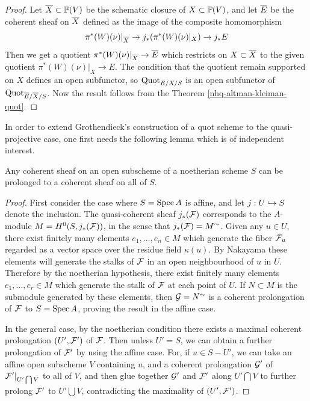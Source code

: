 \begin{proof} Let $\overline{X} \subset \mathbb{P}(V)$ be the schematic closure of
$X\subset \mathbb{P}(V)$, and let $\overline{E}$ be the coherent sheaf on $\overline{X}$
defined as the image of the composite homomorphism
$$\pi^*(W)(\nu)|_{\overline{X}} \to j_*(\pi^*(W)(\nu)|_X) \to j_*E$$
Then we get a quotient $\pi^*(W)(\nu)|_{\overline{X}} \to \overline{E}$
which restricts on $X\subset \overline{X}$ to the given quotient
$\pi^*(W)(\nu)|_X\to E$. The condition that the quotient remain supported
on $X$ defines an open subfunctor, so
$\operatorname{Quot}_{E/X/S}$ is an open subfunctor of
$\operatorname{Quot}_{\overline{E}/\overline{X}/S}$. Now the result follows from the
Theorem \ref{nhq-altman-kleiman-quot}.\end{proof}



\medskip

In order to extend Grothendieck's construction of a quot
scheme to the quasi-projective case, one first needs the following lemma
which is of independent interest.


\begin{lemma}\label{nhq-coherent-prolongation}
Any coherent sheaf on an open subscheme of a noetherian scheme $S$ can be
prolonged to a coherent sheaf on all of $S$.
\end{lemma}

\begin{proof} First consider the case where $S = \operatorname{Spec} A$ is affine, and
let $j: U\hookrightarrow S$ denote the inclusion.
The quasi-coherent sheaf
$j_*(\mathcal{F})$ corresponds to the $A$-module $M = H^0(S,j_*(\mathcal{F}))$,
in the sense that $j_*(\mathcal{F}) = M^{\sim}$.
Given any $u\in U$, there exist finitely many
elements $e_1,\ldots,e_n \in M$
which generate the fiber $\mathcal{F}_u$ regarded as a vector space
over the residue field $\kappa(u)$. By Nakayama these elements
will generate the stalks of $\mathcal{F}$ in an open neighbourhood of $u$ in $U$.
Therefore by the noetherian hypothesis, there exist finitely many
elements $e_1,\ldots,e_r \in M$ which generate the stalk of $\mathcal{F}$
at each point of $U$. If $N\subset M$ is the submodule generated by these
elements, then $\mathcal{G} = N^{\sim}$ is a coherent prolongation of
$\mathcal{F}$ to $S = \operatorname{Spec} A$, proving the result in the affine case.

In the general case, by the
noetherian condition there exists a maximal coherent prolongation
$(U',\mathcal{F}')$ of $\mathcal{F}$. Then unless $U' = S$, we can obtain
a further prolongation of $\mathcal{F}'$ by using the affine case.
For, if $u\in S- U'$,
we can take an affine open subscheme $V$ containing $u$, and a
coherent prolongation $\mathcal{G}'$ of $\mathcal{F}'|_{U'\bigcap V}$ to all of $V$,
and then glue together $\mathcal{G}'$ and $\mathcal{F}'$ along $U'\bigcap V$ to
further prolong $\mathcal{F}'$ to $U'\bigcup V$,
contradicting the maximality of $(U',\mathcal{F}')$.
\end{proof}


